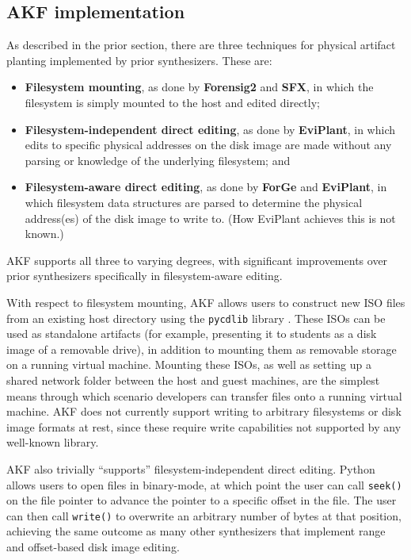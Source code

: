\subsection{AKF implementation}\label{akf-implementation}

As described in the prior section, there are three techniques for
physical artifact planting implemented by prior synthesizers. These are:

\begin{itemize}
\tightlist
\item
  \textbf{Filesystem mounting}, as done by \textbf{Forensig2} and
  \textbf{SFX}, in which the filesystem is simply mounted to the host
  and edited directly;
\item
  \textbf{Filesystem-independent direct editing}, as done by
  \textbf{EviPlant}, in which edits to specific physical addresses on
  the disk image are made without any parsing or knowledge of the
  underlying filesystem; and
\item
  \textbf{Filesystem-aware direct editing}, as done by \textbf{ForGe}
  and \textbf{EviPlant}, in which filesystem data structures are parsed
  to determine the physical address(es) of the disk image to write to.
  (How EviPlant achieves this is not known.)
\end{itemize}

AKF supports all three to varying degrees, with significant improvements
over prior synthesizers specifically in filesystem-aware editing.

With respect to filesystem mounting, AKF allows users to construct new
ISO files from an existing host directory using the
\passthrough{\lstinline!pycdlib!} library
\cite{lalancetteClalancettePycdlib2025}. These ISOs can be used as
standalone artifacts (for example, presenting it to students as a disk
image of a removable drive), in addition to mounting them as removable
storage on a running virtual machine. Mounting these ISOs, as well as
setting up a shared network folder between the host and guest machines,
are the simplest means through which scenario developers can transfer
files onto a running virtual machine. AKF does not currently support
writing to arbitrary filesystems or disk image formats at rest, since
these require write capabilities not supported by any well-known
library.

AKF also trivially ``supports'' filesystem-independent direct editing.
Python allows users to open files in binary-mode, at which point the
user can call \passthrough{\lstinline!seek()!} on the file pointer to
advance the pointer to a specific offset in the file. The user can then
call \passthrough{\lstinline!write()!} to overwrite an arbitrary number
of bytes at that position, achieving the same outcome as many other
synthesizers that implement range and offset-based disk image editing.

